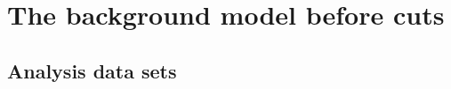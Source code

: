 
\chapter{The background model before cuts}\label{chap:bkgbefore}

\section{Analysis data sets}%
\label{sec:bkgraw:data}

\begin{table}[t]
  \small
  \centering
  \caption{%
    Properties of the data sets considered in this analysis. Further
    details about the \gerda\ detectors can be found in past
    publications~\cite{Agostini2013a, Agostini2018a}.
  }\label{tab:bkgraw:datasetdesc}
  
\end{table}%
